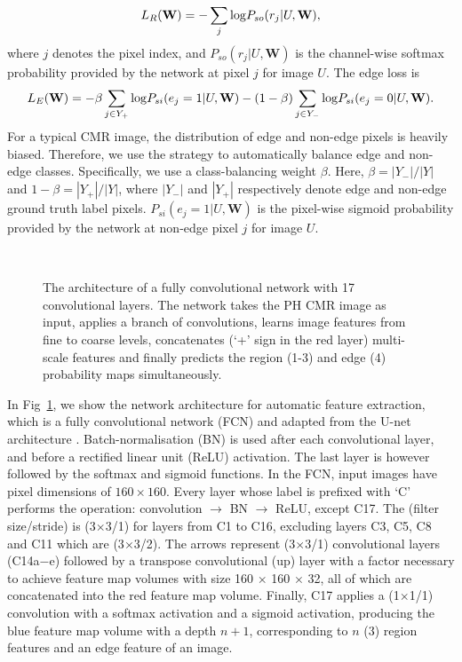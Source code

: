 \documentclass[runningheads,a4paper]{llncs}
\begin{document}
\begin{equation} \label{eq:Rloss}
L_R(\textbf{W}) = -\sum\limits_{j}{\rm{log}}P_{so}(r_j|U,\textbf{W}),
\end{equation} 
where $j$ denotes the pixel index, and $P_{so}(r_j|U,\textbf{W})$ is the channel-wise softmax probability provided by the network at pixel $j$ for image $U$. The edge loss is 
\begin{equation} \label{eq:Eloss}
L_E(\textbf{W}) = -\beta\sum\limits_{j \in Y_+}{\rm{log}} P_{si}(e_j=1|U,\textbf{W}) - (1-\beta)\sum\limits_{j \in Y_-}{\rm{log}}P_{si}(e_j=0|U,\textbf{W}).
\end{equation}
For a typical CMR image, the distribution of edge and non-edge pixels is heavily biased. Therefore, we use the strategy  \cite{xie2015holistically} to automatically balance edge and non-edge classes. Specifically, we use a class-balancing weight $\beta$. Here, $\beta  =  |Y_ -|/|Y|$ and $1-\beta=|Y_ +|/|Y|$, where $|Y_-|$ and $|Y_+|$ respectively denote edge and non-edge ground truth label pixels. $P_{si}(e_j=1|U,\textbf{W})$ is the pixel-wise sigmoid probability provided by the network at non-edge pixel $j$ for image $U$. 

\begin{figure}[h!] 
\vspace{-10pt}
\\
\caption{The architecture of a fully convolutional network with 17 convolutional layers. The network takes the PH CMR image as input, applies a branch of convolutions, learns image features from fine to coarse levels, concatenates (`+' sign in the red layer) multi-scale features and finally predicts the region (1-3) and edge (4) probability maps simultaneously. }
\vspace{-10pt}
\label{fig:network}
\end{figure}

In Fig~\ref{fig:network}, we show the network architecture for automatic feature extraction, which is a fully convolutional network (FCN) and adapted from the U-net architecture \cite{simonyan2014very}. Batch-normalisation (BN) is used after each convolutional layer, and before a rectified linear unit (ReLU) activation. The last layer is however followed by the softmax and sigmoid functions. In the FCN, input images have pixel dimensions of $160 \times 160$. Every layer whose label is prefixed with `C' performs the operation: convolution $\to$ BN $\to$ ReLU, except C17. The (filter size/stride) is (3$\times$3/1) for layers from C1 to C16, excluding layers C3, C5, C8 and C11 which are (3$\times$3/2). The arrows represent (3$\times$3/1) convolutional layers (C14a$-$e) followed by a transpose convolutional (up) layer with a factor necessary to achieve feature map volumes with size 160 $\times$ 160 $\times$ 32, all of which are concatenated into the red feature map volume. Finally, C17 applies a (1$\times$1/1) convolution with a softmax activation and a sigmoid activation, producing the blue feature map volume with a depth $n+1$, corresponding to $n$ (3) region features and an edge feature of an image.
\end{document}
